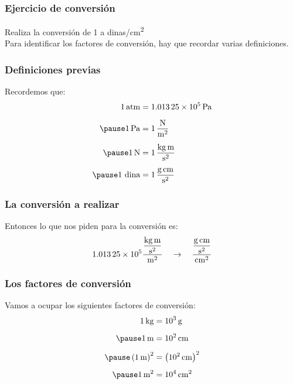 \documentclass[14pt]{beamer}
\begin{document}
\begin{frame}
\frametitle{Ejercicio de conversión}
Realiza la conversión de \SI{1}{\atm} a dinas/\unit{\square\centi\meter}
\\
\bigskip
\pause
Para identificar los factores de conversión, hay que recordar varias definiciones.
\end{frame}
\begin{frame}
\frametitle{Definiciones previas}
Recordemos que:
\begin{eqnarray*}
\begin{aligned}
\SI{1}{atm} &= \SI{1.01325d5}{\pascal} \\[0.5em] \pause
\SI{1}{\pascal} &= \SI[per-mode=fraction]{1}{\newton\per\square\meter} \\[0.5em] \pause
\SI{1}{\newton} &= \SI[per-mode=fraction]{1}{\kilo\gram\meter\per\square\second} \\[0.5em] \pause
1 \,\, \text{dina} &= \SI[per-mode=fraction]{1}{\gram\centi\meter\per\square\second}
\end{aligned}
\end{eqnarray*}
\end{frame}
\begin{frame}
\frametitle{La conversión a realizar}
Entonces lo que nos piden para la conversión es:
\pause
\begin{eqnarray*}
\begin{aligned}
\num{1.01325d5} \dfrac{\displaystyle \unit[per-mode=fraction]{\kilo\gram\meter\per\square\second}}{\unit{\square\meter}} \quad \rightarrow \quad \dfrac{\displaystyle \unit[per-mode=fraction]{\gram\centi\meter\per\square\second}}{\unit{\square\centi\meter}}
\end{aligned}
\end{eqnarray*}
\end{frame}
\begin{frame}
\frametitle{Los factores de conversión}
Vamos a ocupar los siguientes factores de conversión:
\pause
\begin{eqnarray*}
\begin{aligned}
\SI{1}{\kilo\gram} &= \SI{d3}{\gram} \\[0.5em] \pause
\SI{1}{\meter} &= \SI{d2}{\centi\meter} \\[0.5em] \pause
\left( \SI{1}{\meter} \right)^{2} &= \left( \SI{d2}{\centi\meter} \right)^{2} \\[0.5em] \pause
\SI{1}{\square\meter} &= \SI{d4}{\square\centi\meter}
\end{aligned}
\end{eqnarray*}
\end{frame}
\end{document}
